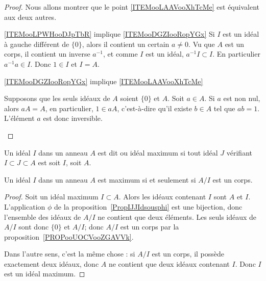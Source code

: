 \begin{proof}
    Nous allons montrer que le point \ref{ITEMooLAAVooXhTcMe} est équivalent aux deux autres.
    \begin{subproof}
        \item[\ref{ITEMooLPWHooDJpTbR} implique \ref{ITEMooDGZIooRopYGx}]
            Si \( I\) est un idéal à gauche différent de \( \{ 0 \}\), alors il contient un certain \( a\neq 0\). Vu que \( A\) est un corps, il contient un inverse \( a^{-1}\), et comme \( I\) est un idéal, \( a^{-1} I\subset I\). En particulier \( a^{-1}a\in I\). Donc \( 1\in I\) et \( I=A\).
        \item[\ref{ITEMooDGZIooRopYGx} implique \ref{ITEMooLAAVooXhTcMe}]

            Supposons que les seuls idéaux de \( A\) soient \( \{ 0 \}\) et \( A\). Soit \( a\in A\). Si \( a\) est non nul, alors \( aA=A\), en particulier, \( 1\in aA\), c'est-à-dire qu'il existe \( b\in A\) tel que \( ab=1\). L'élément \( a\) est donc inversible.
    \end{subproof}
\end{proof}

\begin{definition}\label{DEFIdealMax}
Un idéal \( I\) dans un anneau \( A \) est dit  ou idéal maximum si tout idéal \( J \) vérifiant \( I \subset J \subset A \) est soit \( I \), soit \( A \).
\end{definition}

\begin{proposition}     \label{PROPooSHHWooCyZPPw}
    Un idéal \( I\) dans un anneau \( A \) est maximum si et seulement si \( A/I\) est un corps.
\end{proposition}

\begin{proof}
    Soit un idéal maximum \( I\subset A\). Alors les idéaux contenant \( I\) sont \( A\) et \( I\). L'application \( \phi\) de la proposition~\ref{PropIJJIdsousphi} est une bijection, donc l'ensemble des idéaux de \( A/I\) ne contient que deux éléments. Les seuls idéaux de \( A/I\) sont donc \( \{ 0 \}\) et \( A/I\); donc \( A/I\) est un corps par la proposition~\ref{PROPooUOCVooZGAVVk}.

    Dans l'autre sens, c'est la même chose : si \( A/I\) est un corps, il possède exactement deux idéaux, donc \( A\) ne contient que deux idéaux contenant $I$. Donc \( I\) est un idéal maximum.
\end{proof}

